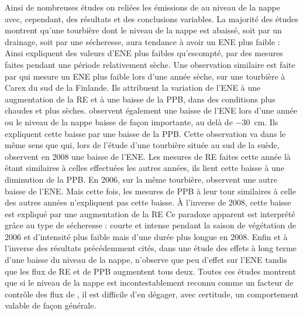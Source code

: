 Ainsi de nombreuses études on reliées les émissions de \coo au niveau de la nappe avec, cependant, des résultats et des conclusions variables.
La majorité des études montrent qu'une tourbière dont le niveau de la nappe est abaissé, soit par un drainage, soit par une sécheresse, aura tendance à avoir un ENE plus faible :
Ainsi \citet{strack2013} expliquent des valeurs d'ENE plus faibles qu'escompté, par des mesures faites pendant une période relativement sèche.
Une observation similaire est faite par \citet{aurela2007} qui mesure un ENE plus faible lors d'une année sèche, sur une tourbière à Carex du sud de la Finlande.
Ils attribuent la variation de l'ENE à une augmentation de la RE et à une baisse de la PPB, dans des conditions plus chaudes et plus sèches.
\citet{peichl2014} observent également une baisse de l'ENE lors d'une année ou le niveau de la nappe baisse de façon importante, au delà de \SI{-30}{\centi\metre}.
Ils expliquent cette baisse par une baisse de la PPB.
Cette observation va dans le même sens que \citet{lund2012} qui, lors de l'étude d'une tourbière située au sud de la suède, observent en 2008 une baisse de l'ENE.
Les mesures de RE faites cette année là étant similaires à celles effectuées les autres années, ils lient cette baisse à une diminution de la PPB.
En 2006, sur la même tourbière, \citet{lund2012} observent une autre baisse de l'ENE.
Mais cette fois, les mesures de PPB à leur tour similaires à celle des autres années n'expliquent pas cette baisse.
À l'inverse de 2008, cette baisse est expliqué par une augmentation de la RE
Ce paradoxe apparent est interprété grâce au type de sécheresse : courte et intense pendant la saison de végétation de 2006 et d'intensité plus faible mais d'une durée plus longue en 2008.
Enfin et à l'inverse des résultats précédemment cités, \citet{ballantyne2014} dans une étude des effets à long terme d'une baisse du niveau de la nappe, n'observe que peu d'effet sur l'ENE tandis que les flux de RE et de PPB augmentent tous deux.
Toutes ces études montrent que si le niveau de la nappe est incontestablement reconnu comme un facteur de contrôle des flux de \coo, il est difficile d'en dégager, avec certitude, un comportement valable de façon générale.

